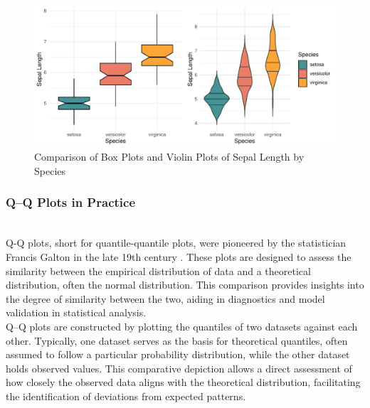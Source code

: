 \documentclass{article}\usepackage[]{graphicx}\usepackage[]{xcolor}
\makeatletter
\def\maxwidth{ %
  \ifdim\Gin@nat@width>\linewidth
    \linewidth
  \else
    \Gin@nat@width
  \fi
}
\newenvironment{knitrout}{}{} %
\numberwithin{equation}{section}
\makeatother
\begin{document}
\begin{knitrout}\scriptsize
{}\color{fgcolor}\begin{figure}[h]

{\centering \includegraphics[width=\maxwidth]{figure/beamer-box-plots-1} 

}

\caption[Comparison of Box Plots and Violin Plots of Sepal Length by Species]{Comparison of Box Plots and Violin Plots of Sepal Length by Species}\label{fig:box-plots}
\end{figure}

\end{knitrout}

\subsubsection{Q–Q Plots in Practice}\\

\noindent Q-Q plots, short for quantile-quantile plots, were pioneered by the statistician Francis Galton in the late 19th century \cite{galton1875iv}. These plots are designed to assess the similarity between the empirical distribution of data and a theoretical distribution, often the normal distribution. This comparison provides insights into the degree of similarity between the two, aiding in diagnostics and model validation in statistical analysis.\\

\noindent Q–Q plots are constructed by plotting the quantiles of two datasets against each other. Typically, one dataset serves as the basis for theoretical quantiles, often assumed to follow a particular probability distribution, while the other dataset holds observed values. This comparative depiction allows a direct assessment of how closely the observed data aligns with the theoretical distribution, facilitating the identification of deviations from expected patterns.\\
\end{document}
